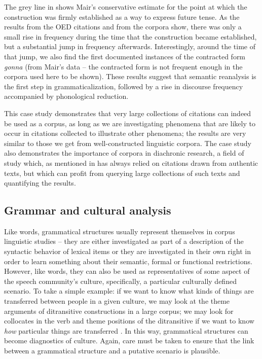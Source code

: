 The grey line in  shows Mair's conservative estimate for the point at which the construction was firmly established as a way to express future tense. As the results from the OED  citations and from the corpora show, there was only a small rise in frequency  during the time that the construction became established, but a substantial jump in frequency afterwards. Interestingly, around the time of that jump, we also find the first documented instances of the contracted form \textit{gonna} (from Mair's data -- the contracted form is not frequent enough in the corpora used here to be shown). These results suggest that semantic  reanalysis is the first step in grammaticalization,  followed by a rise in discourse frequency  accompanied by phonological reduction.

This case study demonstrates that very large  collections of citations can indeed be used as a corpus, as long as we are investigating phenomena that are likely to occur in citations collected to illustrate other phenomena; the results are very similar to those we get from well\hyp{}constructed linguistic corpora. The case study also demonstrates the importance of corpora in diachronic  research, a field of study which, as mentioned in  has always relied on citations drawn from authentic  texts, but which can profit from querying  large  collections of such texts and quantifying  the results.

\subsection{Grammar and cultural analysis}
\label{sec:grammarandculturalanalysis}

Like words, grammatical  structures usually represent themselves in corpus linguistic studies -- they are either investigated as part of a description  of the syntactic  behavior of lexical items or they are investigated in their own right in order to learn something about their semantic,  formal or functional restrictions. However, like words, they can also be used as representatives  of some aspect of the speech community's culture,  specifically, a particular culturally defined scenario. To take a simple example: if we want to know what kinds of things are transferred between people in a given culture, we may look at the theme arguments of ditransitive  constructions in a large  corpus; we may look for collocates  in the verb  and theme positions of the ditransitive if we want to know \textit{how} particular things are transferred \citep[cf.][]{ludeling_corpora_2009}. In this way, grammatical  structures can become diagnostics of culture.  Again, care must be taken to ensure that the link between a grammatical structure and a putative scenario is plausible.


